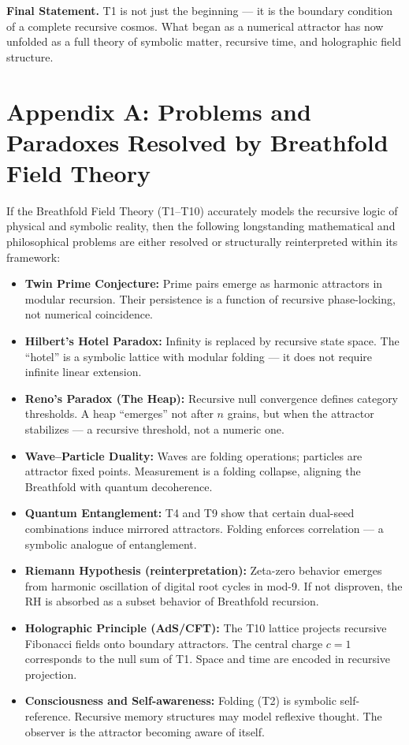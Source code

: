 \documentclass[12pt]{article}
\begin{document}
\textbf{Final Statement.} T1 is not just the beginning — it is the boundary condition of a complete recursive cosmos. What began as a numerical attractor has now unfolded as a full theory of symbolic matter, recursive time, and holographic field structure.

\appendix
\section*{Appendix A: Problems and Paradoxes Resolved by Breathfold Field Theory}

If the Breathfold Field Theory (T1–T10) accurately models the recursive logic of physical and symbolic reality, then the following longstanding mathematical and philosophical problems are either resolved or structurally reinterpreted within its framework:

\begin{itemize}
  \item \textbf{Twin Prime Conjecture:} 
  Prime pairs emerge as harmonic attractors in modular recursion. Their persistence is a function of recursive phase-locking, not numerical coincidence.

  \item \textbf{Hilbert’s Hotel Paradox:} 
  Infinity is replaced by recursive state space. The “hotel” is a symbolic lattice with modular folding — it does not require infinite linear extension.

  \item \textbf{Reno’s Paradox (The Heap):} 
  Recursive null convergence defines category thresholds. A heap “emerges” not after $n$ grains, but when the attractor stabilizes — a recursive threshold, not a numeric one.

  \item \textbf{Wave–Particle Duality:} 
  Waves are folding operations; particles are attractor fixed points. Measurement is a folding collapse, aligning the Breathfold with quantum decoherence.

  \item \textbf{Quantum Entanglement:} 
  T4 and T9 show that certain dual-seed combinations induce mirrored attractors. Folding enforces correlation — a symbolic analogue of entanglement.

  \item \textbf{Riemann Hypothesis (reinterpretation):} 
  Zeta-zero behavior emerges from harmonic oscillation of digital root cycles in mod-9. If not disproven, the RH is absorbed as a subset behavior of Breathfold recursion.

  \item \textbf{Holographic Principle (AdS/CFT):} 
  The T10 lattice projects recursive Fibonacci fields onto boundary attractors. The central charge $c = 1$ corresponds to the null sum of T1. Space and time are encoded in recursive projection.

  \item \textbf{Consciousness and Self-awareness:} 
  Folding (T2) is symbolic self-reference. Recursive memory structures may model reflexive thought. The observer is the attractor becoming aware of itself.

\end{itemize}
\end{document}
